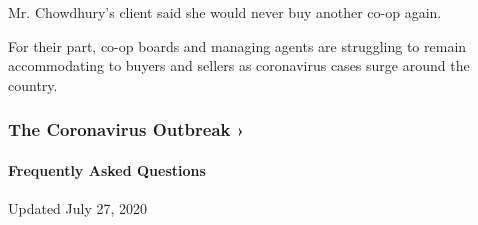 Mr. Chowdhury's client said she would never buy another co-op again.

For their part, co-op boards and managing agents are struggling to
remain accommodating to buyers and sellers as coronavirus cases surge
around the country.

\href{https://www.nytimes.com/news-event/coronavirus?action=click\&pgtype=Article\&state=default\&region=MAIN_CONTENT_3\&context=storylines_faq}{}

\hypertarget{the-coronavirus-outbreak-}{%
\subsubsection{The Coronavirus Outbreak
›}\label{the-coronavirus-outbreak-}}

\hypertarget{frequently-asked-questions}{%
\paragraph{Frequently Asked
Questions}\label{frequently-asked-questions}}

Updated July 27, 2020


